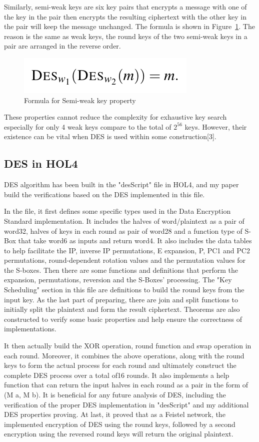 \documentclass{article}
\begin{document}
Similarly, semi-weak keys are six key pairs that encrypts a message with one of the key in the pair then encrypts the resulting
ciphertext with the other key in the pair will keep the message unchanged. The formula is shown in Figure~\ref{fig:form3}. The reason
is the same as weak keys, the round keys of the two semi-weak keys in a pair are arranged in the reverse order.

\begin{figure}
\centering
\includegraphics[width=0.25\linewidth]{formula3}
\caption{\label{fig:form3} Formula for Semi-weak key property}
\end{figure}

These properties cannot reduce the complexity for exhaustive key search especially for only 4 weak keys compare to the total
of $2^{56}$ keys. However, their existence can be vital when DES is used within some construction[3].

\subsection{DES in HOL4}
DES algorithm has been built in the "desScript" file in HOL4, and my paper build the verifications based on the DES implemented
in this file.

In the file, it first defines some specific types used in
the Data Encryption Standard implementation. It includes the halves of word/plaintext as a pair of word32, halves of
keys in each round as pair of word28 and a function type of S-Box that take word6 as inputs and return
word4. It also includes the data tables to help facilitate the IP, inverse IP permutations, E expansion, P, PC1 and PC2
permutations, round-dependent rotation values and the permutation values for the S-boxes. Then there are
some functions and definitions that perform the expansion, permutations, reversion and the S-Boxes' processing. The "Key Scheduling" section
in this file are definitions to build the round keys from the input key. As the last part of preparing, there are
join and split functions to initially split the plaintext and form the result ciphertext. Theorems are also constructed to
verify some basic properties and help ensure the correctness of implementations.

It then actually build the XOR operation, round function and swap operation in each round. Moreover, it combines the above operations, along with the
round keys to form the actual process for each round and ultimately construct the complete DES process over a total of16 rounds.
It also implements a help function that can return the input halves in each round as a pair in the form of (M a, M b). It is beneficial
for any future analysis of DES, including the verification of the proper DES implementation in "desScript" and my additional DES
properties proving. At last, it proved that as a Feistel network, the implemented encryption of DES using the round
keys, followed by a second encryption using the reversed round keys will return the original plaintext.
\end{document}

